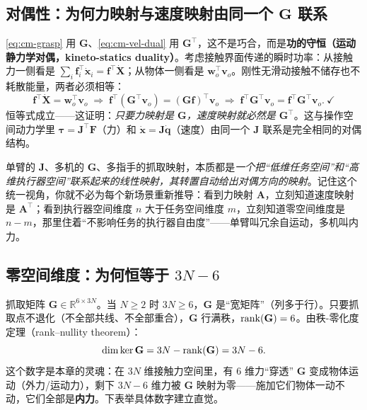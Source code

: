 \subsection{对偶性：为何力映射与速度映射由同一个 \texorpdfstring{$\mathbf{G}$}{G} 联系}
\label{sec:cm-grasp-duality}
\cref{eq:cm-grasp} 用 $\mathbf{G}$、\cref{eq:cm-vel-dual} 用 $\mathbf{G}^\top$，这不是巧合，而是\textbf{功的守恒（运动静力学对偶，kineto-statics duality）}。考虑接触界面传递的瞬时功率：从接触力一侧看是 $\sum_i\mathbf{f}_i^\top\dot{\mathbf{x}}_i=\mathbf{f}^\top\dot{\mathbf{X}}$；从物体一侧看是 $\mathbf{w}_o^\top\mathbf{v}_o$。刚性无滑动接触不储存也不耗散能量，两者必须相等：
\begin{equation}
  \mathbf{f}^\top\dot{\mathbf{X}}=\mathbf{w}_o^\top\mathbf{v}_o
  \;\Longrightarrow\;
  \mathbf{f}^\top(\mathbf{G}^\top\mathbf{v}_o)=(\mathbf{G}\mathbf{f})^\top\mathbf{v}_o
  \;\Longrightarrow\;
  \mathbf{f}^\top\mathbf{G}^\top\mathbf{v}_o=\mathbf{f}^\top\mathbf{G}^\top\mathbf{v}_o.\ \checkmark
  \label{eq:cm-duality}
\end{equation}
恒等式成立——这证明：\emph{只要力映射是 $\mathbf{G}$，速度映射就必然是 $\mathbf{G}^\top$}。这与操作空间动力学里 $\boldsymbol{\tau}=\mathbf{J}^\top\mathbf{F}$（力）和 $\dot{\mathbf{x}}=\mathbf{J}\dot{\mathbf{q}}$（速度）由同一个 $\mathbf{J}$ 联系是完全相同的对偶结构。

\begin{insight}[对偶性的统一视角]
单臂的 $\mathbf{J}$、多机的 $\mathbf{G}$、多指手的抓取映射，本质都是\emph{一个把“低维任务空间”和“高维执行器空间”联系起来的线性映射，其转置自动给出对偶方向的映射}。记住这个统一视角，你就不必为每个新场景重新推导：看到力映射 $\mathbf{A}$，立刻知道速度映射是 $\mathbf{A}^\top$；看到执行器空间维度 $n$ 大于任务空间维度 $m$，立刻知道零空间维度是 $n-m$，那里住着“不影响任务的执行器自由度”——单臂叫冗余自运动，多机叫内力。
\end{insight}

\subsection{零空间维度：为何恒等于 \texorpdfstring{$3N-6$}{3N-6}}
\label{sec:cm-grasp-null}
抓取矩阵 $\mathbf{G}\in\mathbb{R}^{6\times 3N}$。当 $N\ge 2$ 时 $3N\ge 6$，$\mathbf{G}$ 是“宽矩阵”（列多于行）。只要抓取点不退化（不全部共线、不全部重合），$\mathbf{G}$ 行满秩，$\operatorname{rank}(\mathbf{G})=6$。由秩-零化度定理（rank--nullity theorem）：
\begin{equation}
  \dim\ker\mathbf{G}=3N-\operatorname{rank}(\mathbf{G})=3N-6.
  \label{eq:cm-null-dim}
\end{equation}
这个数字是本章的灵魂：在 $3N$ 维接触力空间里，有 $6$ 维力“穿透” $\mathbf{G}$ 变成物体运动（外力/运动力），剩下 $3N-6$ 维力被 $\mathbf{G}$ 映射为零——施加它们物体一动不动，它们全部是\textbf{内力}。下表举具体数字建立直觉。


